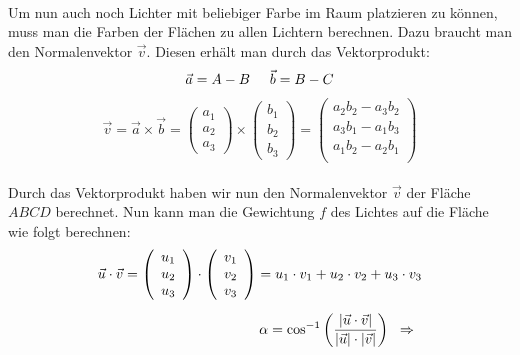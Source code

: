\documentclass{article}
\begin{document}
\begin{titlepage}
\begin{center}
\begin{minipage}{10cm}
\end{minipage}
\\[1cm]
\begin{raggedright}
	\sf\small Um nun auch noch Lichter mit beliebiger Farbe im Raum platzieren zu können, muss man die Farben der Flächen zu allen Lichtern berechnen. Dazu braucht man den Normalenvektor $\vec{v}$. Diesen erhält man durch das Vektorprodukt:
	\\[-2mm]
	\[
	\vec{a}=A-B\hspace{5mm}\vec{b}=B-C
	\]
	\[
	\vec{v} = \vec{a}\times \vec{b} =
	\left(\begin{array}{ccc}a_1\\a_2\\a_3\end{array}\right)\times
	\left(\begin{array}{ccc}b_1\\b_2\\b_3\end{array}\right)=
	\left(\begin{array}{ccc}
		a_2 b_2 - a_3 b_2\\
		a_3 b_1 - a_1 b_3\\
		a_1 b_2 - a_2 b_1\\
	\end{array}\right)
	\]\\[5mm]
	Durch das Vektorprodukt haben wir nun den Normalenvektor $\vec{v}$ der Fläche $ABCD$ berechnet. Nun kann man die Gewichtung $f$ des Lichtes auf die Fläche wie folgt berechnen:
	\\[-3mm]
	\begin{eqnarray*}
		\vec{u}\cdot\vec{v} = \left(
		\begin{array}{ccc}u_1\\u_2\\u_3\end{array} \right) \cdot \left(
		\begin{array}{ccc}v_1\\v_2\\v_3\end{array}
		\right) = u_1 \cdot v_1 + u_2 \cdot v_2 + u_3 \cdot v_3\\[2mm]
		\alpha = \cos^{-1}\left(\frac{\displaystyle |\vec{u}\cdot\vec{v}|}{\displaystyle |\vec{u}|\cdot|\vec{v}|}\right)
		\hspace{2mm}\Rightarrow\hspace{2mm}

\end{eqnarray*}
\end{raggedright}
\end{center}
\end{titlepage}
\end{document}
